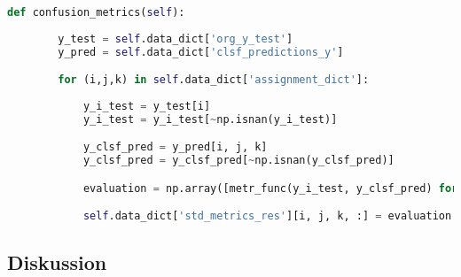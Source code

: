 \begin{lstlisting}[language=Python, numbers=none]
def confusion_metrics(self):
	
        y_test = self.data_dict['org_y_test']
        y_pred = self.data_dict['clsf_predictions_y']

        for (i,j,k) in self.data_dict['assignment_dict']:
            
            y_i_test = y_test[i]
            y_i_test = y_i_test[~np.isnan(y_i_test)]

            y_clsf_pred = y_pred[i, j, k]
            y_clsf_pred = y_clsf_pred[~np.isnan(y_clsf_pred)]

            evaluation = np.array([metr_func(y_i_test, y_clsf_pred) for (name, metr_func) in self.std_metric_list])

            self.data_dict['std_metrics_res'][i, j, k, :] = evaluation
\end{lstlisting}


\subsection{Diskussion}







